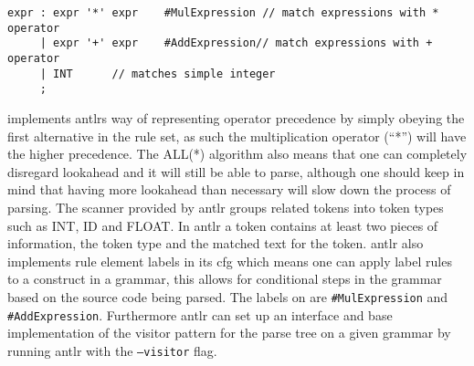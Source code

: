 \begin{lstlisting}[caption={An ambiguous rule for expr which ANTLR handles by applying the first rule of the production if possible},frame=tlrb,label={lst:amb}]
expr : expr '*' expr 	#MulExpression // match expressions with * operator
     | expr '+' expr 	#AddExpression// match expressions with + operator
     | INT 		// matches simple integer
     ;
\end{lstlisting}
 implements \acrshort{antlr}s way of representing operator precedence by simply obeying the first alternative in the rule set, as such the multiplication operator (``*'') will have the higher precedence.
The ALL(*) algorithm also means that one can completely disregard lookahead and it will still be able to parse, although one should keep in mind that having more lookahead than necessary will slow down the process of parsing.
The scanner provided by \acrshort{antlr} groups related tokens into token types such as INT, ID and FLOAT.
In \acrshort{antlr} a token contains at least two pieces of information, the token type and the matched text for the token.
\acrshort{antlr} also implements rule element labels in its \acrfull{cfg} which means one can apply label rules to a construct in a grammar, this allows for conditional steps in the grammar based on the source code being parsed.
The labels on  are \texttt{\#MulExpression} and \texttt{\#AddExpression}.
Furthermore \acrshort{antlr} can set up an interface and base implementation of the visitor pattern for the parse tree on a given grammar by running \acrshort{antlr} with the \texttt{--visitor} flag. \citep{ALLSTAR, LLSTAR, antlr4_Book}
